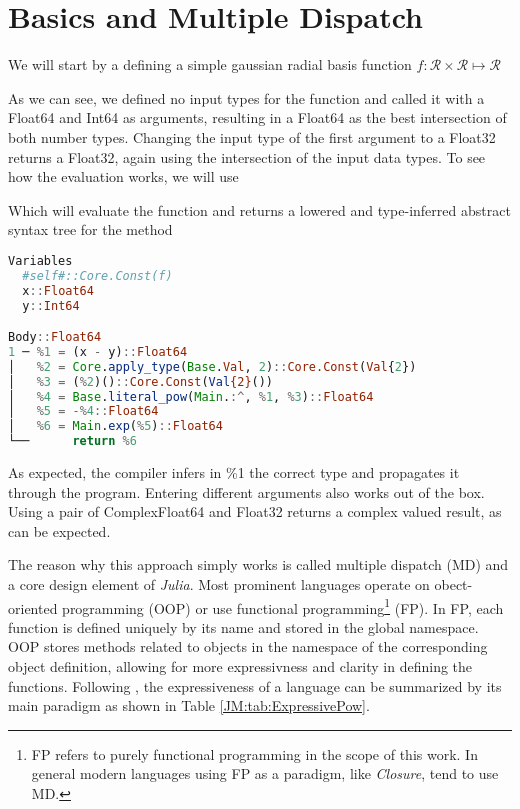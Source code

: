 \section{Basics and Multiple Dispatch}
\label{JM:sec:examples}

We will start by a defining a simple gaussian radial basis function $f : \mathcal{R} \times \mathcal{R} \mapsto \mathcal{R}$ 



As we can see, we defined no input types for the function and called it with a Float64 and Int64 as arguments, resulting in a Float64 as the best intersection of both number types.
Changing the input type of the first argument to a Float32 returns a Float32, again using the intersection of the input data types. To see how the evaluation works, we will use



Which will evaluate the function and returns a lowered and type-inferred abstract syntax tree for the method

\begin{lstlisting}[language=Julia]
    Variables
  #self#::Core.Const(f)
  x::Float64
  y::Int64

Body::Float64
1 ─ %1 = (x - y)::Float64
│   %2 = Core.apply_type(Base.Val, 2)::Core.Const(Val{2})
│   %3 = (%2)()::Core.Const(Val{2}())
│   %4 = Base.literal_pow(Main.:^, %1, %3)::Float64
│   %5 = -%4::Float64
│   %6 = Main.exp(%5)::Float64
└──      return %6
\end{lstlisting}

As expected, the compiler infers in \%1 the correct type and propagates it through the program.
Entering different arguments also works out of the box. Using a pair of ComplexFloat64 and Float32 
returns a complex valued result, as can be expected.



The reason why this approach simply works is called multiple dispatch (MD) and a core design element of \textit{Julia}. Most prominent languages operate on
obect-oriented programming (OOP) or use functional programming\footnote{FP refers to purely functional programming in the scope of this work. In general modern languages using FP as a paradigm, like \textit{Closure}, tend to use MD.} (FP).
In FP, each function is defined uniquely by its name and stored in the global namespace. OOP stores methods related to objects in the namespace
of the corresponding object definition, allowing for more expressivness and clarity in defining the functions. Following \cite{JMKarpinski2019}, the expressiveness of 
a language can be summarized by its main paradigm as shown in Table \ref{JM:tab:ExpressivePow}.

